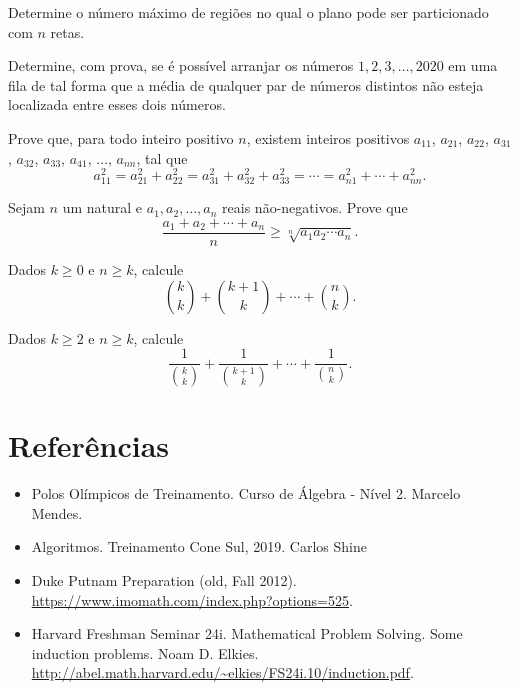 \documentclass[10pt, a4paper]{article}
\begin{document}
	\begin{prob}
		Determine o número máximo de regiões no qual o plano pode ser particionado com $n$ retas.
	\end{prob}

	\begin{prob}
		Determine, com prova, se é possível arranjar os números $1, 2, 3, \dots, 2020$ em uma fila de tal forma que a média de qualquer par de números distintos não esteja localizada entre esses dois números.
	\end{prob}

	\begin{prob}
		Prove que, para todo inteiro positivo $n$, existem inteiros positivos $a_{11}$, $a_{21}$, $a_{22}$, $a_{31}$, $a_{32}$, $a_{33}$, $a_{41}$, $\dots$, $a_{nn}$, tal que \[a_{11}^2 = a_{21}^2 + a_{22}^2 = a_{31}^2 + a_{32}^2 + a_{33}^2 = \cdots = a_{n1}^2 + \cdots + a_{nn}^2.\]
	\end{prob}

	\begin{prob}[MA $\ge$ MG]
		Sejam $n$ um natural e $a_1, a_2, \dots, a_n$ reais não-negativos. Prove que \[\frac{a_1 + a_2 + \cdots + a_n}{n} \ge \sqrt[n]{a_1 a_2 \cdots a_n}.\]
	\end{prob}


	\begin{prob}
		Dados $k \ge 0$ e $n \ge k$, calcule \[\binom{k}{k} + \binom{k+1}{k} + \cdots + \binom{n}{k}.\]
	\end{prob}

	\begin{prob}
		Dados $k \ge 2$ e $n \ge k$, calcule \[\frac{1}{\binom{k}{k}} + \frac{1}{\binom{k+1}{k}} + \cdots + \frac{1}{\binom{n}{k}}.\]
	\end{prob}


	\section{Referências}

	\begin{itemize}
		\item Polos Olímpicos de Treinamento. Curso de Álgebra - Nível 2. Marcelo Mendes.
		\item Algoritmos. Treinamento Cone Sul, 2019. Carlos Shine
		\item Duke Putnam Preparation (old, Fall 2012). \url{https://www.imomath.com/index.php?options=525}.
		\item Harvard Freshman Seminar 24i. Mathematical Problem Solving. Some induction problems. Noam D. Elkies. \url{http://abel.math.harvard.edu/~elkies/FS24i.10/induction.pdf}.
	\end{itemize}
\end{document}
